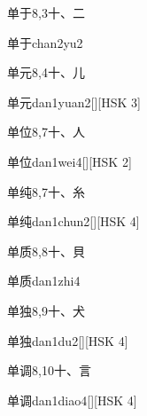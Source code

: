 \begin{entry}{单于}{8,3}{⼗、⼆}
  \begin{phonetics}{单于}{chan2yu2}
  \end{phonetics}
\end{entry}

\begin{entry}{单元}{8,4}{⼗、⼉}
  \begin{phonetics}{单元}{dan1yuan2}[][HSK 3]
  \end{phonetics}
\end{entry}

\begin{entry}{单位}{8,7}{⼗、⼈}
  \begin{phonetics}{单位}{dan1wei4}[][HSK 2]
  \end{phonetics}
\end{entry}

\begin{entry}{单纯}{8,7}{⼗、⽷}
  \begin{phonetics}{单纯}{dan1chun2}[][HSK 4]
  \end{phonetics}
\end{entry}

\begin{entry}{单质}{8,8}{⼗、⾙}
  \begin{phonetics}{单质}{dan1zhi4}
  \end{phonetics}
\end{entry}

\begin{entry}{单独}{8,9}{⼗、⽝}
  \begin{phonetics}{单独}{dan1du2}[][HSK 4]
  \end{phonetics}
\end{entry}

\begin{entry}{单调}{8,10}{⼗、⾔}
  \begin{phonetics}{单调}{dan1diao4}[][HSK 4]
  \end{phonetics}
\end{entry}

